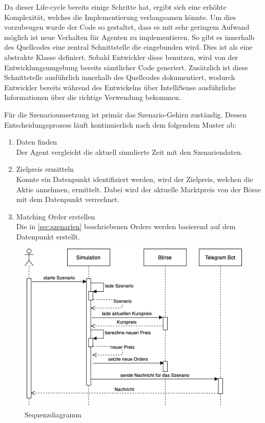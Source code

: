 Da dieser Life-cycle bereits einige Schritte hat, ergibt sich eine erhöhte Komplexität, welches die Implementierung verlangsamen könnte.
Um dies vorzubeugen wurde der Code so gestaltet, dass es mit sehr geringem Aufwand möglich ist neue Verhalten für Agenten zu implementieren. So gibt es innerhalb des Quellcodes eine zentral Schnittstelle die eingebunden wird. Dies ist als eine abstrakte Klasse definiert. Sobald Entwickler diese benutzen, wird von der Entwicklungsumgebung bereits sämtlicher Code generiert. Zusätzlich ist diese Schnittstelle ausführlich innerhalb des Quellcodes dokumentiert, wodurch Entwickler bereits während des Entwickelns über IntelliSense ausführliche Informationen über die richtige Verwendung bekommen.


Für die Szenarioumsetzung ist primär das Szenario-Gehirn zuständig. Dessen Entscheidungsprozess läuft kontinuierlich nach dem folgendem Muster ab:
\begin{enumerate}
    \item Daten finden\\
        Der Agent vergleicht die aktuell simulierte Zeit mit den Szenariendaten.
    \item Zielpreis ermitteln\\
        Konnte ein Datenpunkt identifiziert werden, wird der Zielpreis, welchen die Aktie annehmen, ermittelt. Dabei wird der aktuelle Marktpreis von der Börse mit dem Datenpunkt verrechnet.
    \item Matching Order erstellen\\
        Die in \autoref{sec:szenarien} beschriebenen Orders werden basierend auf dem Datenpunkt erstellt.
\end{enumerate}

\begin{figure}[ht]
    \includegraphics[width=\textwidth]{img/Sequenzdiagramm.png}
    \centering
    \caption{Sequenzdiagramm}
    \label{fig:Sequenzdiagramm}
\end{figure}